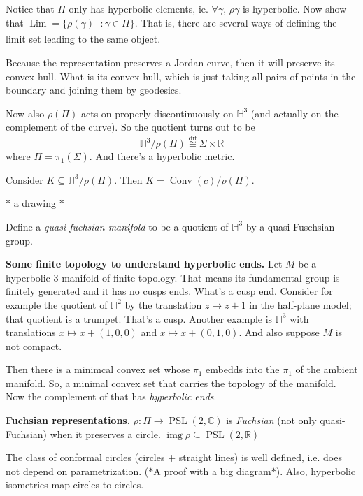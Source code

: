 \begin{exercise}
\label{exercise-smith-limit-set-equal}
Notice that $\Pi$ only has hyperbolic
elements, ie. $\forall \gamma$, $\rho\gamma$
is hyperbolic. Now show that
$\operatorname{Lim}=\{\rho(\gamma)_+:\gamma
\in
\Pi\}$. That is, there are several ways of
defining the limit set leading to the same
object.
\end{exercise}

Because the representation preserves a Jordan
curve, then it will preserve its convex hull.
What is its convex hull, which is just taking
all pairs of points in the boundary and
joining them by geodesics.

Now also $\rho(\Pi)$ acts on properly
discontinuously on $\mathbb{H}^{3}$ (and
actually on the complement of the curve). So
the quotient turns out to be
$$\mathbb{H}^{3}/\rho(\Pi)
\overset{\operatorname{dif}}{\cong
} \Sigma\times \mathbb{R}$$
where $\Pi=\pi_{1}(\Sigma)$. And there's a
hyperbolic metric.

Consider $K\subseteq
\mathbb{H}^{3}/\rho(\Pi)$. Then
$K=\operatorname{Conv}(c)/\rho(\Pi)$.

$*$ a drawing $*$

Define a \textit{quasi-fuchsian manifold} to
be a quotient of $\mathbb{H}^{3}$ by a
quasi-Fuschsian group.

\medskip\noindent
{\bf Some finite topology to understand
hyperbolic ends.}
Let $M$ be a hyperbolic 3-manifold of finite
topology. That means its fundamental group is
finitely generated and it has no cusps ends.
What's a cusp end. Consider for example the
quotient of $\mathbb{H}^{2}$ by the
translation $z\mapsto z+1$ in the half-plane
model; that quotient is a trumpet. That's a
cusp. Another example is $\mathbb{H}^{3}$
with translations $x\mapsto x+(1,0,0)$ and
$x\mapsto x+(0,1,0)$. And also suppose $M$ is
not compact.

Then there is a minimcal convex set whose
$\pi_1$ embedds into the $\pi_1$ of the
ambient manifold. So, a minimal convex set
that carries the topology of the manifold.
Now the complement of that has
\textit{hyperbolic ends}.

\medskip\noindent
{\bf Fuchsian representations.}
$\rho:\Pi\longrightarrow
\operatorname{PSL}(2,\mathbb{C})$ is
\textit{Fuchsian} (not only quasi-Fuchsian)
when it preserves a circle.
$\operatorname{img} \rho\subseteq
\operatorname{PSL}(2,\mathbb{R})$

\begin{remark}
\label{remark-smith-conformal-circles}
The class of conformal circles (circles +
straight lines) is well defined, i.e. does
not depend on parametrization. ($*$A proof
with a big diagram$*$). Also, hyperbolic
isometries map circles to circles.
\end{remark}

